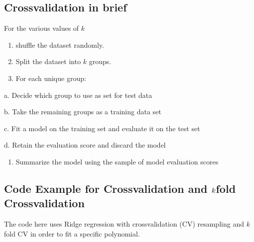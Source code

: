 \documentclass[letterpaper,10pt,english]{sphinxmanual}
\begin{document}
\subsection{Cross\sphinxhyphen{}validation in brief}
\label{\detokenize{chapter4:cross-validation-in-brief}}
For the various values of \(k\)
\begin{enumerate}
%
\item {} 
shuffle the dataset randomly.

\item {} 
Split the dataset into \(k\) groups.

\item {} 
For each unique group:

\end{enumerate}

a. Decide which group to use as set for test data

b. Take the remaining groups as a training data set

c. Fit a model on the training set and evaluate it on the test set

d. Retain the evaluation score and discard the model
\begin{enumerate}
%
\item {} 
Summarize the model using the sample of model evaluation scores

\end{enumerate}


\subsection{Code Example for Cross\sphinxhyphen{}validation and \protect\(k\protect\)\sphinxhyphen{}fold Cross\sphinxhyphen{}validation}
\label{\detokenize{chapter4:code-example-for-cross-validation-and-k-fold-cross-validation}}
The code here uses Ridge regression with cross\sphinxhyphen{}validation (CV)  resampling and \(k\)\sphinxhyphen{}fold CV in order to fit a specific polynomial.
\end{document}
